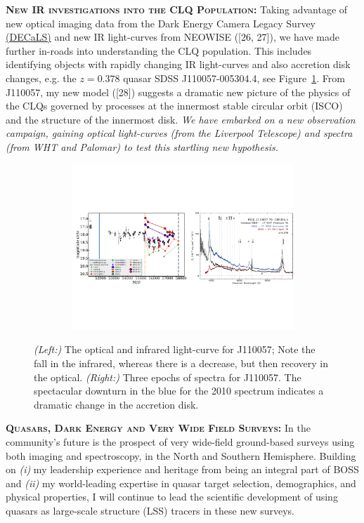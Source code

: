 \documentclass[oneside, a4paper, onecolumn, 11pt]{article}
\begin{document}
\smallskip \smallskip
\smallskip
\smallskip
\noindent
\textbf{\textsc{New IR investigations into the CLQ Population:}}
Taking advantage of new optical imaging data from the Dark Energy
Camera Legacy Survey \href{http://legacysurvey.org/decamls/}{(DECaLS)}
and new IR light-curves from NEOWISE ([26, 27]), we have made further
in-roads into understanding the CLQ population. This includes
identifying objects with rapidly changing IR light-curves and also
accretion disk changes, e.g. the $z=0.378$ quasar SDSS
J110057-005304.4, see Figure~\ref{fig:J110057}. From J110057, my new
model ([28]) suggests a dramatic new picture of the physics of the
CLQs governed by processes at the innermost stable circular orbit
(ISCO) and the structure of the innermost disk. {\it We have embarked
on a new observation campaign, gaining optical light-curves (from the
Liverpool Telescope) and spectra (from WHT and Palomar) to test this
startling new hypothesis.}
\begin{figure}[h]
  \begin{center}
    \hspace{-0.5cm}
    \includegraphics[height=6.25cm,width=17.2cm]
    {figures/J110057_LC_Spectra_20171024.pdf}
    \vspace{-10pt}
    \caption{%
      \footnotesize 
      {\it (Left:)} The optical and infrared light-curve for J110057; 
      Note the fall in the infrared, whereas there is a decrease, but 
      then recovery in the optical. 
      {\it (Right:)} 
      Three epochs of spectra for J110057. 
      The spectacular downturn in the blue for the 2010 spectrum 
      indicates a dramatic change in the accretion disk.
    }
  \vspace{-16pt}
 \label{fig:J110057}
\end{center}
\end{figure}

\smallskip \smallskip
\smallskip
\smallskip
\noindent
\textbf{\textsc{Quasars, Dark Energy and Very Wide Field Surveys: }}
In the community's future is the prospect of very wide-field
ground-based surveys using both imaging and spectroscopy, in the North
and Southern Hemisphere. Building on {\it (i)} my leadership
experience and heritage from being an integral part of BOSS and {\it
(ii)} my world-leading expertise in quasar target selection,
demographics, and physical properties, I will continue to lead the
scientific development of using quasars as large-scale structure (LSS)
tracers in these new surveys.
\end{document}
